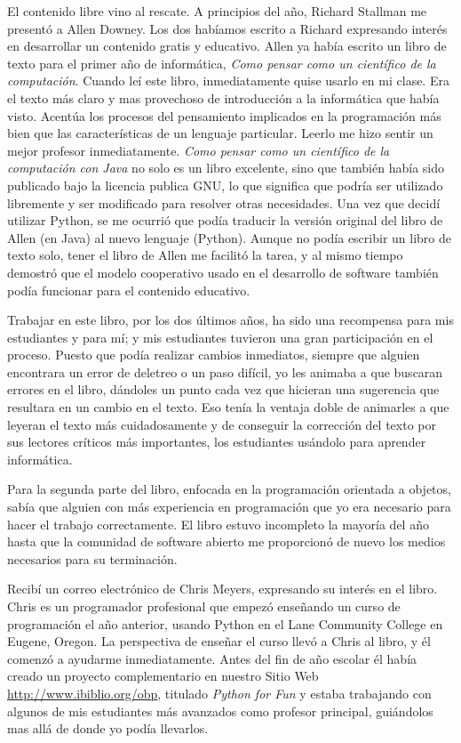 El contenido libre vino al rescate.  A principios del año, Richard Stallman me 
presentó a Allen Downey. Los dos habíamos escrito a Richard expresando 
interés en desarrollar un contenido gratis y educativo. Allen ya había
escrito un libro de texto para el primer año de informática, {\em Como pensar
como un científico de la computación}. Cuando leí este libro, inmediatamente 
quise usarlo en mi clase.  Era el texto más claro y mas provechoso de 
introducción a la informática que había visto.  Acentúa los procesos del 
pensamiento implicados en la programación más bien que las características de un
lenguaje particular.  Leerlo me hizo sentir un  mejor profesor inmediatamente.
{\em Como pensar como un científico de la computación con Java} no solo es un 
libro excelente, sino que también había sido publicado bajo la licencia publica 
GNU, lo que significa que podría ser utilizado libremente y ser modificado para 
resolver otras necesidades.  Una vez que decidí utilizar Python, se me ocurrió 
que podía traducir la versión original  del libro de Allen (en Java) al nuevo
lenguaje (Python). Aunque no podía escribir un libro de texto solo, tener el
libro de Allen me facilitó la tarea, y al mismo tiempo demostró que el modelo 
cooperativo usado en el desarrollo de software también podía  funcionar para el 
contenido educativo.

Trabajar en este libro, por los dos últimos años, ha sido una recompensa para
mis estudiantes y para mí; y mis estudiantes tuvieron una gran participación en 
el proceso. Puesto que podía realizar cambios inmediatos, siempre que alguien 
encontrara un error de deletreo o un paso difícil, yo les animaba a que buscaran
errores en el libro, dándoles un punto cada vez que hicieran una sugerencia que 
resultara en un cambio en el texto. Eso tenía la ventaja doble de animarles a 
que leyeran el texto más cuidadosamente y de conseguir la corrección del texto 
por sus lectores críticos más importantes, los estudiantes usándolo para 
aprender informática. 
 
Para la segunda parte del libro, enfocada en la programación orientada a 
objetos, sabía que alguien con más experiencia en programación que yo era 
necesario para hacer el trabajo correctamente. El libro estuvo  incompleto la 
mayoría del año hasta que la comunidad de software abierto me proporcionó de 
nuevo los medios necesarios para su terminación.

Recibí un correo electrónico de Chris Meyers, expresando su interés en el 
libro. Chris es un programador profesional que empezó enseñando un curso de 
programación el año anterior, usando Python en el Lane Community College en 
Eugene, Oregon. La perspectiva de enseñar el curso llevó a Chris al libro, y él 
comenzó a ayudarme inmediatamente.  Antes del fin de año escolar él había 
creado un proyecto complementario en nuestro Sitio Web 
\url{http://www.ibiblio.org/obp}, titulado {\em Python for Fun} y estaba 
trabajando con algunos de mis estudiantes más avanzados como profesor 
principal, guiándolos mas allá de donde yo podía llevarlos.

